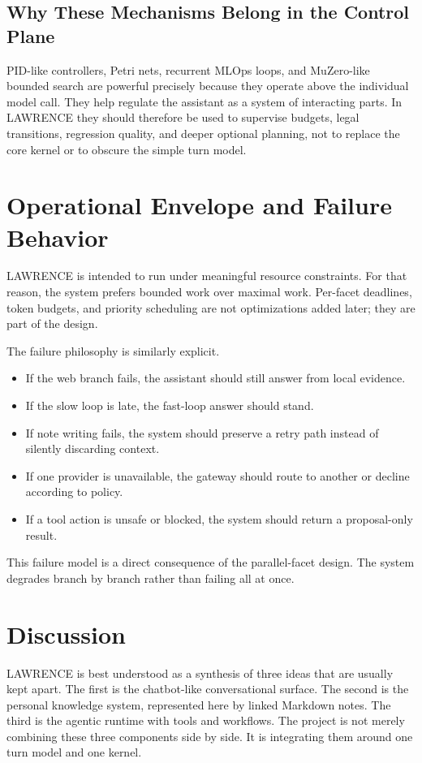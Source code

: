 \documentclass[conference]{IEEEtran}
\begin{document}
\subsection{Why These Mechanisms Belong in the Control Plane}
PID-like controllers, Petri nets, recurrent MLOps loops, and MuZero-like bounded search are powerful precisely because they operate above the individual model call. They help regulate the assistant as a system of interacting parts. In LAWRENCE they should therefore be used to supervise budgets, legal transitions, regression quality, and deeper optional planning, not to replace the core kernel or to obscure the simple turn model.

\section{Operational Envelope and Failure Behavior}
LAWRENCE is intended to run under meaningful resource constraints. For that reason, the system prefers bounded work over maximal work. Per-facet deadlines, token budgets, and priority scheduling are not optimizations added later; they are part of the design.

The failure philosophy is similarly explicit.

\begin{itemize}
\item If the web branch fails, the assistant should still answer from local evidence.
\item If the slow loop is late, the fast-loop answer should stand.
\item If note writing fails, the system should preserve a retry path instead of silently discarding context.
\item If one provider is unavailable, the gateway should route to another or decline according to policy.
\item If a tool action is unsafe or blocked, the system should return a proposal-only result.
\end{itemize}

This failure model is a direct consequence of the parallel-facet design. The system degrades branch by branch rather than failing all at once.

\section{Discussion}
LAWRENCE is best understood as a synthesis of three ideas that are usually kept apart. The first is the chatbot-like conversational surface. The second is the personal knowledge system, represented here by linked Markdown notes. The third is the agentic runtime with tools and workflows. The project is not merely combining these three components side by side. It is integrating them around one turn model and one kernel.
\end{document}
